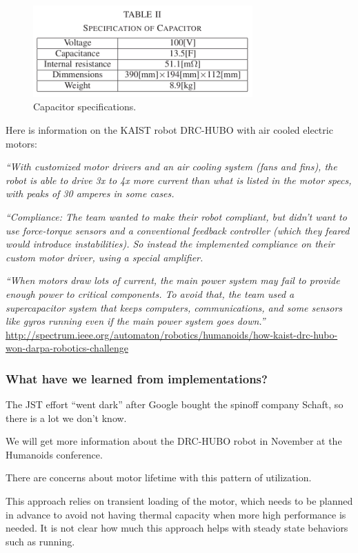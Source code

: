 \documentclass[letterpaper,12pt,fullpage]{article}
\begin{document}
\begin{figure}[h]
\centering
\includegraphics[width=0.75\textwidth]{tech-figs/s2}
\caption{Capacitor specifications.}
\label{f:s2}
\end{figure}

Here is information on the KAIST robot DRC-HUBO with air cooled electric
motors:

{\it ``With customized motor drivers and an air cooling system (fans and fins), the robot is able to drive 3x to 4x more current than what is listed in the motor specs, with peaks of 30 amperes in some cases.}

{\it ``Compliance: The team wanted to make their robot compliant, but didn't want to use force-torque sensors and a conventional feedback controller (which they feared would introduce instabilities). So instead the implemented compliance on their custom motor driver, using a special amplifier.}

{\it ``When motors draw lots of current, the main power system may fail to provide enough power to critical components. To avoid that, the team used a supercapacitor system that keeps computers, communications, and some sensors like gyros running even if the main power system goes down.''}\\
\url{http://spectrum.ieee.org/automaton/robotics/humanoids/how-kaist-drc-hubo-won-darpa-robotics-challenge}

\subsubsection{What have we learned from implementations?}

The JST effort ``went dark'' after Google bought the spinoff company
Schaft, so there is a lot we don't know.

We will get more information about the DRC-HUBO robot in November at
the Humanoids conference.

There are concerns about motor lifetime with this pattern of utilization.

This approach relies on transient loading of the motor, which needs
to be planned in advance to avoid not having thermal capacity
when more high performance is needed.
It is not clear how much this approach helps with 
steady state behaviors such as running.
\end{document}
